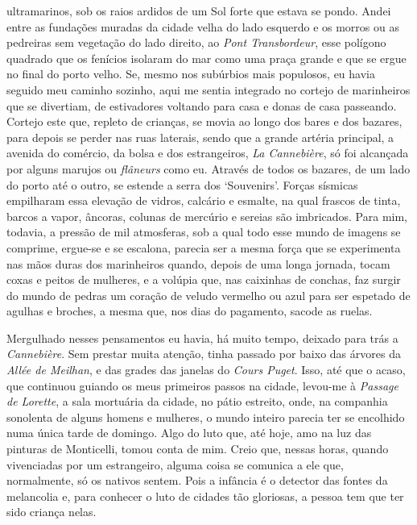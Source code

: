 ultramarinos, sob os raios ardidos de um Sol forte que estava se pondo.
Andei entre as fundações muradas da cidade velha do lado esquerdo e os
morros ou as pedreiras sem vegetação do lado direito, ao \emph{Pont
Transbordeur}, esse polígono quadrado que os fenícios isolaram do mar
como uma praça grande e que se ergue no final do porto velho. Se, mesmo
nos subúrbios mais populosos, eu havia seguido meu caminho sozinho, aqui
me sentia integrado no cortejo de marinheiros que se divertiam, de
estivadores voltando para casa e donas de casa passeando. Cortejo este
que, repleto de crianças, se movia ao longo dos bares e dos bazares,
para depois se perder nas ruas laterais, sendo que a grande artéria
principal, a avenida do comércio, da bolsa e dos estrangeiros, \emph{La
Cannebière}, só foi alcançada por alguns marujos ou \emph{flâneurs} como
eu. Através de todos os bazares, de um lado do porto até o outro, se
estende a serra dos `Souvenirs'. Forças sísmicas empilharam essa
elevação de vidros, calcário e esmalte, na qual frascos de tinta, barcos
a vapor, âncoras, colunas de mercúrio e sereias são imbricados. Para
mim, todavia, a pressão de mil atmosferas, sob a qual todo esse mundo de
imagens se comprime, ergue-se e se escalona, parecia ser a mesma força
que se experimenta nas mãos duras dos marinheiros quando, depois de uma
longa jornada, tocam coxas e peitos de mulheres, e a volúpia que, nas
caixinhas de conchas, faz surgir do mundo de pedras um coração de veludo
vermelho ou azul para ser espetado de agulhas e broches, a mesma que,
nos dias do pagamento, sacode as ruelas.

Mergulhado nesses pensamentos eu havia, há muito tempo, deixado para
trás a \emph{Cannebière}. Sem prestar muita atenção, tinha passado por
baixo das árvores da \emph{Allée de Meilhan}, e das grades das janelas
do \emph{Cours Puget}. Isso, até que o acaso, que continuou guiando os
meus primeiros passos na cidade, levou-me à \emph{Passage de Lorette}, a
sala mortuária da cidade, no pátio estreito, onde, na companhia
sonolenta de alguns homens e mulheres, o mundo inteiro parecia ter se
encolhido numa única tarde de domingo. Algo do luto que, até hoje, amo
na luz das pinturas de Monticelli, tomou conta de mim. Creio que, nessas
horas, quando vivenciadas por um estrangeiro, alguma coisa se comunica a
ele que, normalmente, só os nativos sentem. Pois a infância é o detector
das fontes da melancolia e, para conhecer o luto de cidades tão
gloriosas, a pessoa tem que ter sido criança nelas.

